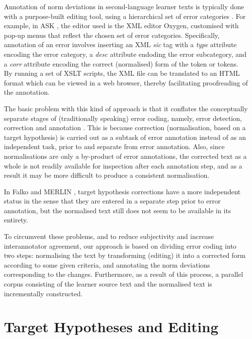 \documentclass[10pt, a4paper]{article}
\begin{document}
Annotation of norm deviations in second-language learner texts is typically done with a purpose-built editing tool, using a hierarchical set of error categories \cite{Granger2008}. For example, in ASK \cite{tenfjord2006ask}, the editor used is the XML editor Oxygen, customised with pop-up menus that reflect the chosen set of error categories. Specifically, annotation of an error involves inserting an XML
{\em sic} tag with a {\em type} attribute encoding the error category, a {\em desc} attribute endoding the error subcategory, and a {\em corr} attribute encoding the correct (normalised) form of the token or tokens. By running a set of XSLT scripts, the XML file can be translated to an HTML format which can be viewed in a web browser, thereby facilitating proofreading of the annotation.

The basic problem with this kind of approach is that it conflates the conceptually separate stages of (traditionally speaking) error coding, namely, error detection, correction and annotation
\cite[page 266]{Ellis1994,Granger2008}. This is because correction (normalisation, based on a target hypothesis) is carried out as a subtask of error annotation instead of as an independent task, prior to and separate from error annotation. Also, since normalisations are only a by-product of error annotations, the corrected text as a whole is not readily available for inspection after each annotation step, and as a result it may be more difficult to produce a consistent normalisation.

In Falko \cite{ludeling05multi-levelerror} and MERLIN \cite{MERLIN2014}, target hypothesis corrections have a more independent status in the sense that they are entered in a separate step prior to error annotation, but the normalised text still does not seem to be available in its entirety.

To circumvent these problems, and to reduce subjectivity and increase interannotator agreement, our approach is based on dividing error coding into two steps: normalising the text by transforming (editing) it into a corrected form according to some given criteria, and annotating the norm deviations corresponding to the changes. Furthermore, as a result of this process, a parallel corpus consisting of the learner source text and the normalised text is incrementally constructed.

\section{Target Hypotheses and Editing}
\label{sec:targethypothesis}
\end{document}
